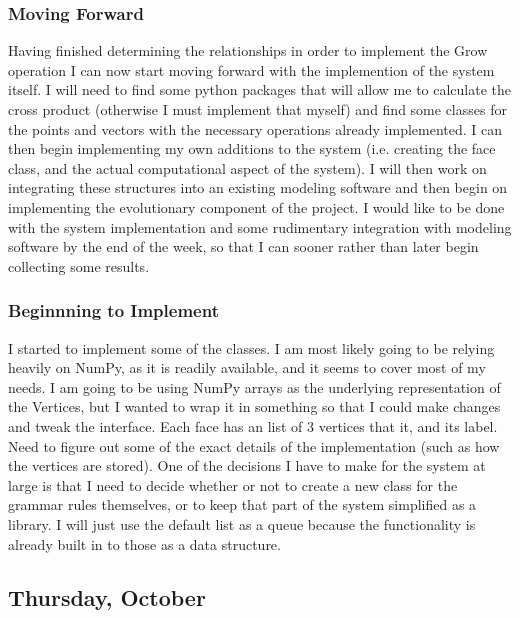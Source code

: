 \documentclass[letterpaper,oneside,titlepage]{article}
\begin{document}
\subsubsection*{Moving Forward}
Having finished determining the relationships in order to implement the Grow operation I can now start moving forward with the implemention of the system itself.  I will need to find some python packages that will allow me to calculate the cross product (otherwise I must implement that myself) and find some classes for the points and vectors with the necessary operations already implemented.  I can then begin implementing my own additions to the system (i.e. creating the face class, and the actual computational aspect of the system).  I will then work on integrating these structures into an existing modeling software and then begin on implementing the evolutionary component of the project.  I would like to be done with the system implementation and some rudimentary integration with modeling software by the end of the week, so that I can sooner rather than later begin collecting some results.
\subsubsection*{Beginnning to Implement}
I started to implement some of the classes.  I am most likely going to be relying heavily on NumPy, as it is readily available, and it seems to cover most of my needs.  I am going to be using NumPy arrays as the underlying representation of the Vertices, but I wanted to wrap it in something so that I could make changes and tweak the interface.  Each face has an list of 3 vertices that it, and its label.  Need to figure out some of the exact details of the implementation (such as how the vertices are stored).  One of the decisions I have to make for the system at large is that I need to decide whether or not to create a new class for the grammar rules themselves, or to keep that part of the system simplified as a library.  I will just use the default list as a queue because the functionality is already built in to those as a data structure.

\subsection*{Thursday, October }
\end{document}
